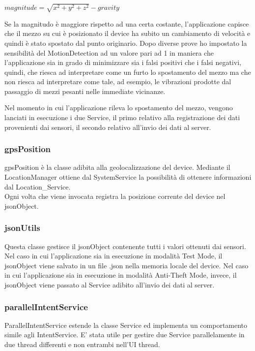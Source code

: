 \documentclass[12pt,a4paper,openright,twoside]{report}
\begin{document}
\begin{center}
$ magnitude = \sqrt{ x^2 + y^2 + z^2} - gravity$
\end{center}

Se la magnitudo è maggiore rispetto ad una certa costante, l'applicazione capisce che il mezzo su cui è posizionato il device ha subito un cambiamento di velocità e quindi è stato spostato dal punto originario. Dopo diverse prove ho impostato la sensibilità del MotionDetection ad un valore pari ad 1 in maniera che l'applicazione sia in grado di minimizzare sia i falsi positivi che i falsi negativi, quindi, che riesca ad interpretare come un furto lo spostamento del mezzo ma che non riesca ad interpretare come tale, ad esempio, le vibrazioni prodotte dal passaggio di mezzi pesanti nelle immediate vicinanze.

Nel momento in cui l'applicazione rileva lo spostamento del mezzo, vengono lanciati in esecuzione i due Service, il primo relativo alla registrazione dei dati provenienti dai sensori, il secondo relativo all'invio dei dati al server.	

\subsubsection*{gpsPosition}
gpsPosition è la classe adibita alla geolocalizzazione del device. Mediante il LocationManager ottiene dal SystemService la possibilità di ottenere informazioni dal Location\_Service. \\
Ogni volta che viene invocata registra la posizione corrente del device nel jsonObject.

\subsubsection*{jsonUtils}
Questa classe gestisce il jsonObject contenente tutti i valori ottenuti dai sensori. Nel caso in cui l'applicazione sia in esecuzione in modalità Test Mode, il jsonObject viene salvato in un file .json nella memoria locale del device. Nel caso in cui l'applicazione sia in esecuzione in modalità Anti-Theft Mode, invece, il jsonObject viene passato al Service adibito all'invio dei dati al server.

\subsubsection*{parallelIntentService}
ParallelIntentService \cite{K19} estende la classe Service ed implementa un comportamento simile agli IntentService.
E' stata utile per gestire due Service parallelamente in due thread differenti e non entrambi nell'UI thread.
\end{document}
